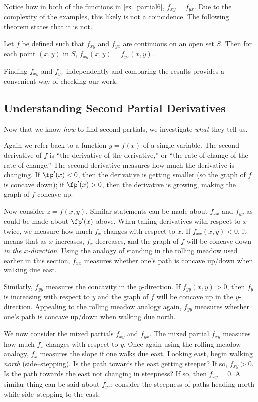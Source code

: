 Notice how in both of the functions in \autoref{ex_partial6}, $f_{xy} = f_{yx}$. Due to the complexity of the examples, this likely is not a coincidence. The following theorem states that it is not.

{Let $f$ be defined such that $f_{xy}$ and $f_{yx}$ are continuous on an open set $S$. Then for each point $(x,y)$ in $S$, $f_{xy}(x,y) = f_{yx}(x,y)$.}

Finding $f_{xy}$ and $f_{yx}$ independently and comparing the results provides a convenient way of checking our work.

\subsection*{Understanding Second Partial Derivatives}

Now that we know \textit{how} to find second partials, we investigate \textit{what} they tell us. 

Again we refer back to a function $y=f(x)$ of a single variable. The second derivative of $f$ is ``the derivative of the derivative,'' or ``the rate of change of the rate of change.'' The second derivative measures how much the derivative is changing. If $\fp'(x)<0$, then the derivative is getting smaller (so the graph of $f$ is concave down); if $\fp'(x)>0$, then the derivative is growing, making the graph of $f$ concave up. 

Now consider $z=f(x,y)$. Similar statements can be made about $f_{xx}$ and $f_{yy}$ as could be made about $\fp'(x)$ above. When taking derivatives with respect to $x$ twice, we measure how much $f_x$ changes with respect to $x$. If $f_{xx}(x,y)<0$, it means that as $x$ increases, $f_x$ decreases, and the graph of $f$ will be concave down \textit{in the $x$-direction}. Using the analogy of standing in the rolling meadow used earlier in this section, $f_{xx}$ measures whether one's path is concave up/down when walking due east.

Similarly, $f_{yy}$ measures the concavity in the $y$-direction. If $f_{yy}(x,y)>0$, then $f_y$ is increasing with respect to $y$ and the graph of $f$ will be concave up in the $y$-direction. Appealing to the rolling meadow analogy again, $f_{yy}$ measures whether one's path is concave up/down when walking due north.

We now consider the mixed partials $f_{xy}$ and $f_{yx}$. The mixed partial $f_{xy}$ measures how much $f_x$ changes with respect to $y$. Once again using the rolling meadow analogy, $f_{x}$ measures the slope if one walks due east. Looking east, begin walking \textit{north} (side--stepping). Is the path towards the east getting steeper? If so, $f_{xy}>0$. Is the path towards the east not changing in steepness? If so, then $f_{xy}=0$. A similar thing can be said about $f_{yx}$: consider the steepness of paths heading north while side--stepping to the east.

